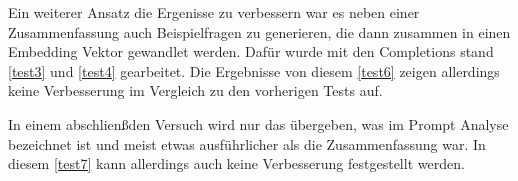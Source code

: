 \documentclass[../main.tex]{subfiles}
\begin{document}
Ein weiterer Ansatz die Ergenisse zu verbessern war es neben einer Zusammenfassung auch Beispielfragen zu generieren, die dann zusammen in einen Embedding Vektor gewandlet werden.
Dafür wurde mit den Completions stand \ref{test3} und \ref{test4} gearbeitet.
Die Ergebnisse von diesem \ref{test6} zeigen allerdings keine Verbesserung im Vergleich zu den vorherigen Tests auf.

In einem abschlienßden Versuch wird nur das übergeben, was im Prompt Analyse bezeichnet ist und meist etwas ausführlicher als die Zusammenfassung war. 
In diesem \ref{test7} kann allerdings auch keine Verbesserung festgestellt werden.
\end{document}
